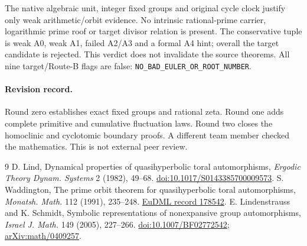 \documentclass[10pt]{article}
\begin{document}
The native algebraic unit, integer fixed groups and original cycle clock
justify only weak arithmetic/orbit evidence. No intrinsic rational-prime
carrier, logarithmic prime roof or target divisor relation is present.
The conservative tuple is weak A0, weak A1, failed A2/A3 and a formal A4
hint; overall the target candidate is rejected. This verdict does not
invalidate the source theorems. All nine target/Route-B flags are false:
\texttt{NO\_BAD\_EULER\_OR\_ROOT\_NUMBER}.

\paragraph{Revision record.}
\ifcase\CRevisionRound Round zero establishes exact fixed groups and rational zeta.
\or Round one adds complete primitive and cumulative fluctuation laws.
\else Round two closes the homoclinic and cyclotomic boundary proofs.
A different team member checked the mathematics. This is not external peer review.\fi

\begin{thebibliography}{9}
 D. Lind, Dynamical properties of quasihyperbolic toral automorphisms,
\emph{Ergodic Theory Dynam. Systems} 2 (1982), 49--68.
\href{https://doi.org/10.1017/S0143385700009573}{doi:10.1017/S0143385700009573}.
 S. Waddington, The prime orbit theorem for quasihyperbolic
toral automorphisms, \emph{Monatsh. Math.} 112 (1991), 235--248.
\href{https://eudml.org/doc/178542}{EuDML record 178542}.
 E. Lindenstrauss and K. Schmidt, Symbolic representations of
nonexpansive group automorphisms, \emph{Israel J. Math.} 149 (2005), 227--266.
\href{https://doi.org/10.1007/BF02772542}{doi:10.1007/BF02772542};
\href{https://arxiv.org/abs/math/0409257}{arXiv:math/0409257}.
\end{thebibliography}
\end{document}
